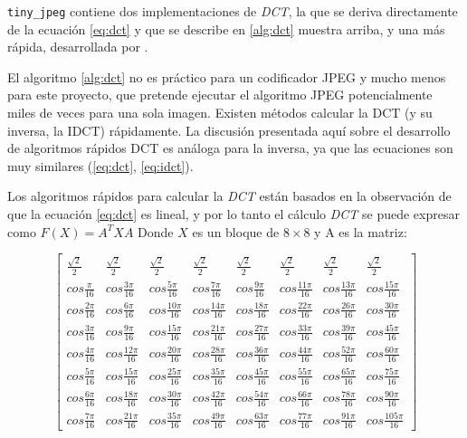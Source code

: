 \verb+tiny_jpeg+ contiene dos implementaciones de \emph{DCT}, la que se deriva
directamente de la ecuación \ref{eq:dct} y que se describe en \ref{alg:dct}
muestra arriba, y una más rápida, desarrollada por \cite{ahmed_dct}.

El algoritmo \ref{alg:dct} no es práctico para un codificador JPEG y mucho
menos para este proyecto, que pretende ejecutar el algoritmo JPEG
potencialmente miles de veces para una sola imagen. Existen métodos calcular la
DCT (y su inversa, la IDCT) rápidamente. La discusión presentada aquí sobre el
desarrollo de algoritmos rápidos DCT es análoga para la inversa, ya que las
ecuaciones son muy similares (\ref{eq:dct}, \ref{eq:idct}).

Los algoritmos rápidos para calcular la \emph{DCT} están basados en la
observación de que la ecuación \ref{eq:dct} es lineal, y por lo tanto el
cálculo \emph{DCT} se puede expresar como $F(X) = A^{T}XA$ Donde $X$ es un bloque de $8\times8$ y A es la matriz:

\begin{equation}
    \label{eq:dct-matrix}
    \begin{bmatrix}
        \frac{\sqrt{2}}{2} & \frac{\sqrt{2}}{2} & \frac{\sqrt{2}}{2} & \frac{\sqrt{2}}{2} & \frac{\sqrt{2}}{2} & \frac{\sqrt{2}}{2} & \frac{\sqrt{2}}{2} & \frac{\sqrt{2}}{2} \\
        cos\frac{\pi}{16} & cos\frac{3\pi}{16}& cos\frac{5\pi}{16}& cos\frac{7\pi}{16}& cos\frac{9\pi}{16}& cos\frac{11\pi}{16}& cos\frac{13\pi}{16}& cos\frac{15\pi}{16} \\
        cos\frac{2\pi}{16} & cos\frac{6\pi}{16}& cos\frac{10\pi}{16}& cos\frac{14\pi}{16}& cos\frac{18\pi}{16}& cos\frac{22\pi}{16}& cos\frac{26\pi}{16}& cos\frac{30\pi}{16} \\
        cos\frac{3\pi}{16} & cos\frac{9\pi}{16}& cos\frac{15\pi}{16}& cos\frac{21\pi}{16}& cos\frac{27\pi}{16}& cos\frac{33\pi}{16}& cos\frac{39\pi}{16}& cos\frac{45\pi}{16} \\
        cos\frac{4\pi}{16} & cos\frac{12\pi}{16}& cos\frac{20\pi}{16}& cos\frac{28\pi}{16}& cos\frac{36\pi}{16}& cos\frac{44\pi}{16}& cos\frac{52\pi}{16}& cos\frac{60\pi}{16} \\
        cos\frac{5\pi}{16} & cos\frac{15\pi}{16}& cos\frac{25\pi}{16}& cos\frac{35\pi}{16}& cos\frac{45\pi}{16}& cos\frac{55\pi}{16}& cos\frac{65\pi}{16}& cos\frac{75\pi}{16} \\
        cos\frac{6\pi}{16} & cos\frac{18\pi}{16}& cos\frac{30\pi}{16}& cos\frac{42\pi}{16}& cos\frac{54\pi}{16}& cos\frac{66\pi}{16}& cos\frac{78\pi}{16}& cos\frac{90\pi}{16} \\
        cos\frac{7\pi}{16} & cos\frac{21\pi}{16}& cos\frac{35\pi}{16}& cos\frac{49\pi}{16}& cos\frac{63\pi}{16}& cos\frac{77\pi}{16}& cos\frac{91\pi}{16}& cos\frac{105\pi}{16}
    \end{bmatrix}
\end{equation}

